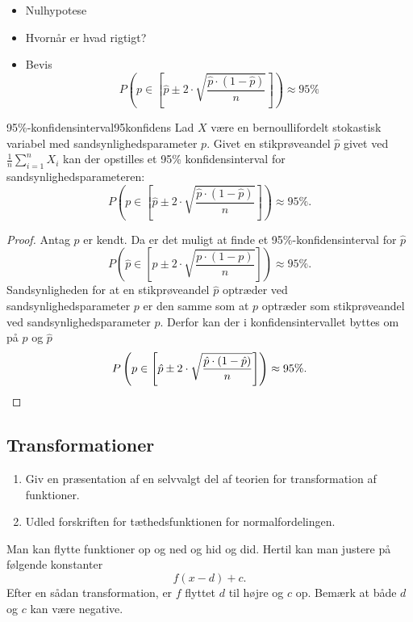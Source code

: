 \documentclass{article}
\begin{document}
\begin{itemize}
    \item Nulhypotese
    \item Hvornår er hvad rigtigt?
    \item Bevis
        \[
            P(p\in[\hat p \pm 2\cdot\sqrt{\frac{\hat p\cdot(1-\hat p)}{n}}]) \approx 95\%
        \]
\end{itemize}

\begin{theorem}{95\%-konfidensinterval}{95konfidens}
    Lad $X$ være en bernoullifordelt stokastisk variabel med
    sandsynlighedsparameter $p$. Givet en stikprøveandel $\hat{p}$ givet ved
    $\frac{1}{n}\sum_{i=1}^n X_i$ kan der opstilles et 95\% konfidensinterval
    for sandsynlighedsparameteren:
    \[
        P\left(p\in\left[\hat p \pm 2\cdot\sqrt{\frac{\hat p\cdot(1-\hat p)}{n}}\right]\right)
        \approx 95\%.
    \] 
\end{theorem}

\begin{proof}
    Antag $p$ er kendt. Da er det muligt at finde et 95\%-konfidensinterval for
    $\hat{p}$
    \[
        P\left(\hat{p}\in\left[p \pm 2\cdot\sqrt{\frac{p\cdot(1-p)}{n}}\right]\right)
        \approx 95\%.
    \] 
    Sandsynligheden for at en stikprøveandel $\hat{p}$ optræder ved
    sandsynlighedsparameter $p$ er den samme som at $p$ optræder som
    stikprøveandel ved sandsynlighedsparameter $\hat{p}$. Derfor kan der i
    konfidensintervallet byttes om på $p$ og $\hat{p}$
    \[
        P\left(p\in\left[\hat p \pm 2\cdot\sqrt{\frac{\hat p\cdot(1-\hat p)}{n}}\right]\right)
        \approx 95\%.\qedhere
    \]
\end{proof}

\begin{tcolorbox}
    \section{Transformationer}
    \tcblower
    \begin{enumerate}
        \item Giv en præsentation af en selvvalgt del af teorien for transformation af funktioner.
        \item Udled forskriften for tæthedsfunktionen for normalfordelingen. 
    \end{enumerate}
\end{tcolorbox}

Man kan flytte funktioner op og ned og hid og did. Hertil kan man justere på
følgende konstanter
\[
    f(x - d) + c.
\] 
Efter en sådan transformation, er $f$ flyttet $d$ til højre og $c$ op. Bemærk
at både $d$ og $c$ kan være negative.
\end{document}
